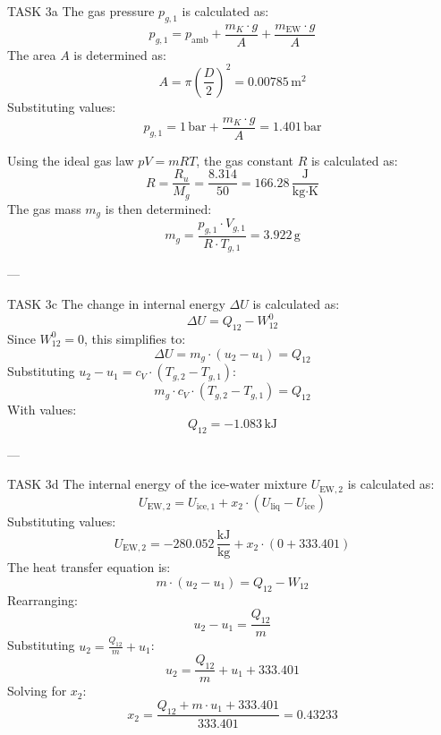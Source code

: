 TASK 3a  
The gas pressure \( p_{g,1} \) is calculated as:  
\[
p_{g,1} = p_{\text{amb}} + \frac{m_K \cdot g}{A} + \frac{m_{\text{EW}} \cdot g}{A}
\]  
The area \( A \) is determined as:  
\[
A = \pi \left(\frac{D}{2}\right)^2 = 0.00785 \, \text{m}^2
\]  
Substituting values:  
\[
p_{g,1} = 1 \, \text{bar} + \frac{m_K \cdot g}{A} = 1.401 \, \text{bar}
\]  

Using the ideal gas law \( pV = mRT \), the gas constant \( R \) is calculated as:  
\[
R = \frac{R_u}{M_g} = \frac{8.314}{50} = 166.28 \, \frac{\text{J}}{\text{kg·K}}
\]  
The gas mass \( m_g \) is then determined:  
\[
m_g = \frac{p_{g,1} \cdot V_{g,1}}{R \cdot T_{g,1}} = 3.922 \, \text{g}
\]  

---

TASK 3c  
The change in internal energy \( \Delta U \) is calculated as:  
\[
\Delta U = Q_{12} - W_{12}^0
\]  
Since \( W_{12}^0 = 0 \), this simplifies to:  
\[
\Delta U = m_g \cdot (u_2 - u_1) = Q_{12}
\]  
Substituting \( u_2 - u_1 = c_V \cdot (T_{g,2} - T_{g,1}) \):  
\[
m_g \cdot c_V \cdot (T_{g,2} - T_{g,1}) = Q_{12}
\]  
With values:  
\[
Q_{12} = -1.083 \, \text{kJ}
\]  

---

TASK 3d  
The internal energy of the ice-water mixture \( U_{\text{EW},2} \) is calculated as:  
\[
U_{\text{EW},2} = U_{\text{ice},1} + x_2 \cdot (U_{\text{liq}} - U_{\text{ice}})
\]  
Substituting values:  
\[
U_{\text{EW},2} = -280.052 \, \frac{\text{kJ}}{\text{kg}} + x_2 \cdot (0 + 333.401)
\]  
The heat transfer equation is:  
\[
m \cdot (u_2 - u_1) = Q_{12} - W_{12}
\]  
Rearranging:  
\[
u_2 - u_1 = \frac{Q_{12}}{m}
\]  
Substituting \( u_2 = \frac{Q_{12}}{m} + u_1 \):  
\[
u_2 = \frac{Q_{12}}{m} + u_1 + 333.401
\]  
Solving for \( x_2 \):  
\[
x_2 = \frac{Q_{12} + m \cdot u_1 + 333.401}{333.401} = 0.43233
\]  

